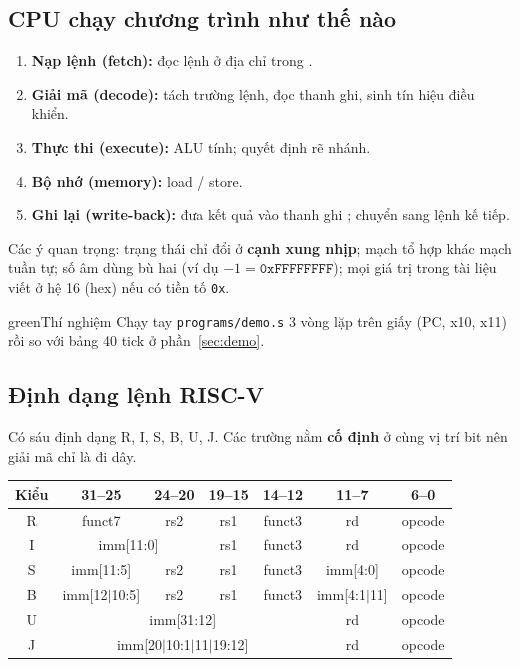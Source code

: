 \documentclass[11pt,a4paper]{article}
\newcommand{\sig}[1]{\texttt{\detokenize{#1}}}
\newenvironment{thinghiem}{\begin{khung}{green}{Thí nghiệm}}{\end{khung}}
\begin{document}
\subsection{CPU chạy chương trình như thế nào}
\begin{enumerate}
  \item \textbf{Nạp lệnh (fetch):} đọc lệnh ở địa chỉ trong \sig{PC}.
  \item \textbf{Giải mã (decode):} tách trường lệnh, đọc thanh ghi, sinh tín hiệu điều khiển.
  \item \textbf{Thực thi (execute):} ALU tính; quyết định rẽ nhánh.
  \item \textbf{Bộ nhớ (memory):} load / store.
  \item \textbf{Ghi lại (write-back):} đưa kết quả vào thanh ghi \sig{rd}; \sig{PC} chuyển sang lệnh kế tiếp.
\end{enumerate}
Các ý quan trọng: trạng thái chỉ đổi ở \textbf{cạnh xung nhịp}; mạch tổ hợp khác mạch tuần tự; số âm dùng bù hai (ví dụ $-1 = \texttt{0xFFFFFFFF}$); mọi giá trị trong tài liệu viết ở hệ 16 (hex) nếu có tiền tố \texttt{0x}.

\begin{thinghiem}
Chạy tay \texttt{programs/demo.s} 3 vòng lặp trên giấy (PC, x10, x11) rồi so với bảng 40 tick ở phần~\ref{sec:demo}.
\end{thinghiem}

\subsection{Định dạng lệnh RISC-V}
Có sáu định dạng R, I, S, B, U, J. Các trường nằm \textbf{cố định} ở cùng vị trí bit nên giải mã chỉ là đi dây.

\begin{center}
\small
\setlength{\tabcolsep}{3pt}
\begin{tabular}{|c|c|c|c|c|c|c|}
\hline
\textbf{Kiểu} & \textbf{31--25} & \textbf{24--20} & \textbf{19--15} & \textbf{14--12} & \textbf{11--7} & \textbf{6--0}\\
\hline
R & funct7 & rs2 & rs1 & funct3 & rd & opcode\\
\hline
I & \multicolumn{2}{c|}{imm[11:0]} & rs1 & funct3 & rd & opcode\\
\hline
S & imm[11:5] & rs2 & rs1 & funct3 & imm[4:0] & opcode\\
\hline
B & imm[12$|$10:5] & rs2 & rs1 & funct3 & imm[4:1$|$11] & opcode\\
\hline
U & \multicolumn{4}{c|}{imm[31:12]} & rd & opcode\\
\hline
J & \multicolumn{4}{c|}{imm[20$|$10:1$|$11$|$19:12]} & rd & opcode\\
\hline
\end{tabular}
\end{center}
\end{document}
